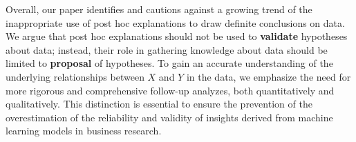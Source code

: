 \documentclass[mnsc,blindrev]{informs3}
\begin{document}



Overall, our paper identifies and cautions against a growing trend of the inappropriate use of post hoc explanations to draw definite conclusions on data. We argue that post hoc explanations should not be used to \textbf{validate} hypotheses about data; instead, their role in gathering knowledge about data should be limited to \textbf{proposal} of hypotheses. To gain an accurate understanding of the underlying relationships between $X$ and $Y$ in the data, we emphasize the need for more rigorous and comprehensive follow-up analyzes, both quantitatively and qualitatively. This distinction is essential to ensure the prevention of the overestimation of the reliability and validity of insights derived from machine learning models in business research.

\end{document}

